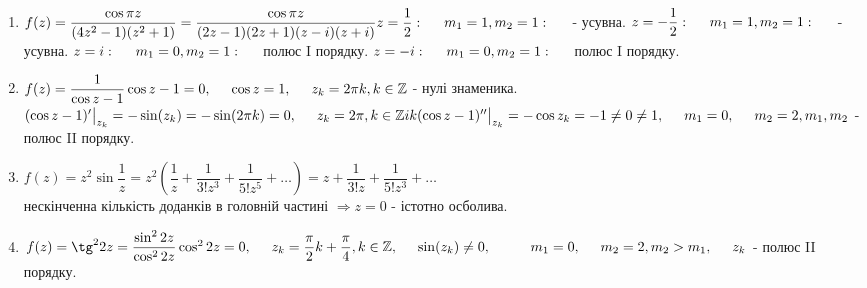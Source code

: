 \documentclass[a4paper,12pt]{article}
\newcommand\tab[1][0.5cm]{\hspace*{#1}}
\begin{document}
\begin{justify}
\begin{enumerate}
\begin{enumerate}
 				\item $f(z)=\dfrac{\cos\pi z}{(4z^2-1)(z^2+1)}=\dfrac{\cos\pi z}{(2z-1)(2z+1)(z-i)(z+i)}\\
 					z=\dfrac12:\tab m_1=1,m_2=1:\tab $ - усувна.
 					$\\z=-\dfrac12:\tab m_1=1,m_2=1:\tab $ - усувна.
 					$\\z=i:\tab m_1=0,m_2=1:\tab$ полюс I порядку.
 					$\\z=-i:\tab m_1=0,m_2=1:\tab$ полюс I порядку.
 				\item $f(z)=\dfrac{1}{\cos z-1}\\\cos z-1=0,\tab \cos z=1,\tab z_k=2\pi k,k\in\mathbb{Z}$ - нулі знаменика.\\$(\cos z-1)'\big|_{z_k}=-\sin(z_k)=-\sin(2\pi k)=0,\tab z_k=2\pi,k\in\mathbb{Z} ik\\(\cos z-1)''\big|_{z_k}=-\cos z_k=-1\neq0\neq1,\tab m_1=0,\tab m_2=2,\\m_1,m_2$ - полюс II порядку.
 				\item $f(z)=z^2\sin\dfrac1z=z^2\left(\dfrac1z+\dfrac{1}{3!z^3}+\dfrac{1}{5!z^5}+\dots\right)=z+\dfrac{1}{3!z}+\dfrac{1}{5!z^3}+\dots$\\ нескінченна кількість доданків в головній частині $\Longrightarrow z=0$ - істотно осболива.
 				\item $f(z)=\tg^22z=\dfrac{\sin^22z}{\cos^22z}\\\cos^22z=0,\tab z_k=\dfrac{\pi}{2}k+\dfrac\pi4, k\in\mathbb{Z},\tab \sin(z_k)\neq0,\tab \tab m_1=0,\tab m_2=2,\\ m_2>m_1,\tab z_k$ - полюс II порядку.
 			\end{enumerate}
 		\end{enumerate}
 		
 	\end{justify}
\end{document}
